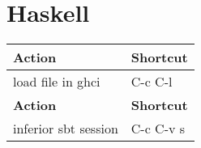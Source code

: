 \documentclass[english]{rcalibrionecolumn}
\begin{document}
\section{Haskell}
\label{sec-19}


\begin{center}
\begin{tabular}{ll}
 \textbf{Action}       &  \textbf{Shortcut}  \\
\hline
 load file in ghci     &  C-c C-l            \\
 \textbf{Action}       &  \textbf{Shortcut}  \\
\hline
 inferior sbt session  &  C-c C-v s          \\
\end{tabular}
\end{center}
\end{document}
